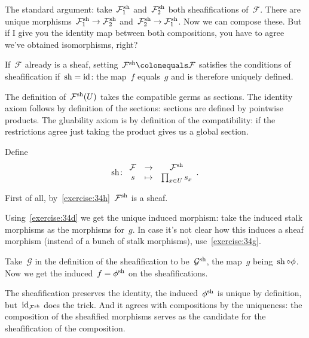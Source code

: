 \begin{exercise}
  \label{exercise:34g}
  The standard argument: take~$\mathcal{F}_1^{\operatorname{sh}}$ and~$\mathcal{F}_2^{\operatorname{sh}}$ both sheafifications of~$\mathcal{F}$. There are unique morphisms~$\mathcal{F}_1^{\operatorname{sh}}\to\mathcal{F}_2^{\operatorname{sh}}$ and~$\mathcal{F}_2^{\operatorname{sh}}\to\mathcal{F}_1^{\operatorname{sh}}$. Now we can compose these. But if I give you the identity map between both compositions, you have to agree we've obtained isomorphisms, right?

  If~$\mathcal{F}$ already is a sheaf, setting~$\mathcal{F}^{\sh}\colonequals\mathcal{F}$ satisfies the conditions of sheafification if~$\operatorname{sh}=\mathrm{id}$: the map~$f$ equals~$g$ and is therefore uniquely defined.
\end{exercise}

\begin{exercise}
  \label{exercise:34h}
  The definition of~$\mathcal{F}^{\operatorname{sh}}(U)$ takes the compatible germs as sections. The identity axiom follows by definition of the sections: sections are defined by pointwise products. The gluability axiom is by definition of the compatibility: if the restrictions agree just taking the product gives us a global section.
\end{exercise}

\begin{exercise}
  Define
  \begin{equation}
    \operatorname{sh}\colon
    \begin{array}{ccc}
      \mathcal{F}&\to&\mathcal{F}^{\operatorname{sh}} \\
      s&\mapsto&\prod_{x\in U}s_x
    \end{array}.
  \end{equation}
\end{exercise}

\begin{exercise}
  First of all, by~\autoref{exercise:34h}~$\mathcal{F}^{\operatorname{sh}}$ is a sheaf.

  Using~\autoref{exercise:34d} we get the unique induced morphism: take the induced stalk morphisms as the morphisms for~$g$. In case it's not clear how this induces a sheaf morphism (instead of a bunch of stalk morphisms), use~\autoref{exercise:34g}.
\end{exercise}

\begin{exercise}
  Take~$\mathcal{G}$ in the definition of the sheafification to be~$\mathcal{G}^{\operatorname{sh}}$, the map~$g$ being~$\operatorname{sh}\circ\phi$. Now we get the induced~$f=\phi^{\operatorname{sh}}$ on the sheafifications.

  The sheafification preserves the identity, the induced~$\phi^{\operatorname{sh}}$ is unique by definition, but~$\mathrm{id}_{\mathcal{F}^{\operatorname{sh}}}$ does the trick. And it agrees with compositions by the uniqueness: the composition of the sheafified morphisms serves as the candidate for the sheafification of the composition.
\end{exercise}

